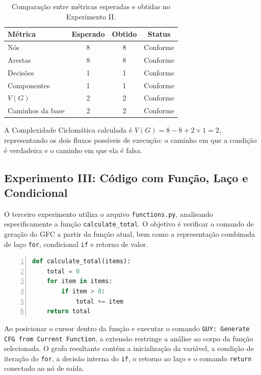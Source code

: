 \begin{table}[H]
    \centering
    \caption{Comparação entre métricas esperadas e obtidas no Experimento II.}
    \begin{tabular}{l | c | c | c}
        \hline
        \textbf{Métrica} & \textbf{Esperado} & \textbf{Obtido} & \textbf{Status} \\ \hline
        Nós & 8 & 8 & Conforme \\ \hline
        Arestas & 8 & 8 & Conforme \\ \hline
        Decisões & 1 & 1 & Conforme \\ \hline
        Componentes & 1 & 1 & Conforme \\ \hline
        \(V(G)\) & 2 & 2 & Conforme \\ \hline
        Caminhos da base & 2 & 2 & Conforme \\ \hline
    \end{tabular}
    \label{tab:experimento2_guy}
\end{table}

A Complexidade Ciclomática calculada é \(V(G) = 8 - 8 + 2 \times 1 = 2\), representando os dois fluxos possíveis de execução: o caminho em que a condição é verdadeira e o caminho em que ela é falsa.

\subsection{Experimento III: Código com Função, Laço e Condicional}

O terceiro experimento utiliza o arquivo \texttt{functions.py}, analisando especificamente a função \texttt{calculate\_total}. O objetivo é verificar o comando de geração do GFC a partir da função atual, bem como a representação combinada de laço \texttt{for}, condicional \texttt{if} e retorno de valor.

\begin{lstlisting}[language=Python, numbers=left, caption={Código utilizado no Experimento III.}, label={lst:experimento3_codigo}]
def calculate_total(items):
    total = 0
    for item in items:
        if item > 0:
            total += item
    return total
\end{lstlisting}

Ao posicionar o cursor dentro da função e executar o comando \texttt{GUY: Generate CFG from Current Function}, a extensão restringe a análise ao corpo da função selecionada. O grafo resultante contém a inicialização da variável, a condição de iteração do \texttt{for}, a decisão interna do \texttt{if}, o retorno ao laço e o comando \texttt{return} conectado ao nó de saída.

